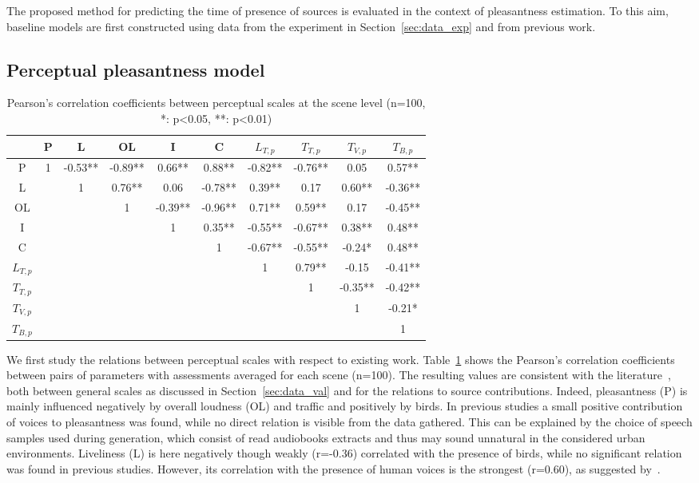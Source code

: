 \documentclass[11pt,a4paper]{article}
\begin{document}
The proposed method for predicting the time of presence of sources is evaluated in the context of pleasantness estimation. To this aim, baseline models are first constructed using data from the experiment in Section~\ref{sec:data_exp} and from previous work.

\subsection{Perceptual pleasantness model}
\label{sec:results_perc}

\begin{table}[h]
\centering
\caption{Pearson's correlation coefficients between perceptual scales at the scene level (n=100, *: p<0.05, **: p<0.01)}
\label{tab:percc}
\begin{tabular}{ c | c c c c c c c c c }
\hline
	 & P & L & OL & I & C & $L_{T, p}$ & $T_{T, p}$ & $T_{V, p}$ & $T_{B, p}$ \\ \hline
	P & 1 & -0.53** & -0.89** & 0.66** & 0.88** & -0.82** & -0.76** & 0.05 & 0.57** \\
	L &  & 1 & 0.76** & 0.06 & -0.78** & 0.39** & 0.17 & 0.60** & -0.36** \\
	OL &  &  & 1 & -0.39** & -0.96** & 0.71** & 0.59** & 0.17 & -0.45** \\
	I &  &  &  & 1 & 0.35** & -0.55** & -0.67** & 0.38** & 0.48** \\
	C &  &  &  &  & 1 & -0.67** & -0.55** & -0.24* & 0.48** \\
	$L_{T, p}$ &  &  &  &  &  & 1 & 0.79** & -0.15 & -0.41** \\
	$T_{T, p}$ &  &  &  &  &  &  & 1 & -0.35** & -0.42** \\
	$T_{V, p}$ &  &  &  &  &  &  &  & 1 & -0.21* \\
	$T_{B, p}$ &  &  &  &  &  &  &  &  & 1 \\ \hline
\end{tabular}
\end{table}

We first study the relations between perceptual scales with respect to existing work. Table~\ref{tab:percc} shows the Pearson's correlation coefficients between pairs of parameters with assessments averaged for each scene (n=100). The resulting values are consistent with the literature~\cite{aumond2017, gontier2018}, both between general scales as discussed in Section~\ref{sec:data_val} and for the relations to source contributions. Indeed, pleasantness (P) is mainly influenced negatively by overall loudness (OL) and traffic and positively by birds. In previous studies a small positive contribution of voices to pleasantness was found, while no direct relation is visible from the data gathered. This can be explained by the choice of speech samples used during generation, which consist of read audiobooks extracts and thus may sound unnatural in the considered urban environments. Liveliness (L) is here negatively though weakly (r=-0.36) correlated with the presence of birds, while no significant relation was found in previous studies. However, its correlation with the presence of human voices is the strongest (r=0.60), as suggested by~\cite{axelsson2010}.
\end{document}
